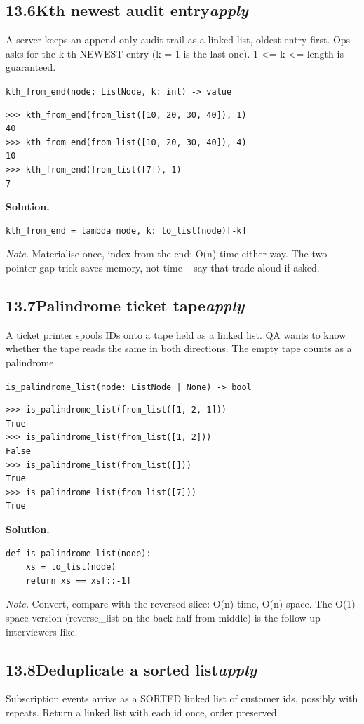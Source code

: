 \documentclass[10pt,letterpaper]{book}
\begin{document}
\subsection*{13.6\quad Kth newest audit entry\hfill\textnormal{\textit{apply}}}
A server keeps an append-only audit trail as a linked list, oldest entry first. Ops asks for the k-th NEWEST entry (k = 1 is the last one). 1 <= k <= length is guaranteed.

\noindent\texttt{kth\_from\_end(node: ListNode, k: int) -> value}
\begin{lstlisting}[style=ex]
>>> kth_from_end(from_list([10, 20, 30, 40]), 1)
40
>>> kth_from_end(from_list([10, 20, 30, 40]), 4)
10
>>> kth_from_end(from_list([7]), 1)
7
\end{lstlisting}
\noindent\textbf{Solution.}
\begin{lstlisting}[style=code]
kth_from_end = lambda node, k: to_list(node)[-k]
\end{lstlisting}
\noindent\textit{Note.} Materialise once, index from the end: O(n) time either way. The two-pointer gap trick saves memory, not time -- say that trade aloud if asked.

\subsection*{13.7\quad Palindrome ticket tape\hfill\textnormal{\textit{apply}}}
A ticket printer spools IDs onto a tape held as a linked list. QA wants to know whether the tape reads the same in both directions. The empty tape counts as a palindrome.

\noindent\texttt{is\_palindrome\_list(node: ListNode | None) -> bool}
\begin{lstlisting}[style=ex]
>>> is_palindrome_list(from_list([1, 2, 1]))
True
>>> is_palindrome_list(from_list([1, 2]))
False
>>> is_palindrome_list(from_list([]))
True
>>> is_palindrome_list(from_list([7]))
True
\end{lstlisting}
\noindent\textbf{Solution.}
\begin{lstlisting}[style=code]
def is_palindrome_list(node):
    xs = to_list(node)
    return xs == xs[::-1]
\end{lstlisting}
\noindent\textit{Note.} Convert, compare with the reversed slice: O(n) time, O(n) space. The O(1)-space version (reverse\_list on the back half from middle) is the follow-up interviewers like.

\subsection*{13.8\quad Deduplicate a sorted list\hfill\textnormal{\textit{apply}}}
Subscription events arrive as a SORTED linked list of customer ids, possibly with repeats. Return a linked list with each id once, order preserved.
\end{document}
